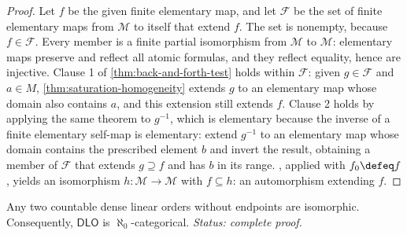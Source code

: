 \begin{proof}
Let \(f\) be the given finite elementary map, and let \(\mathcal F\) be
the set of finite elementary maps from \(\mathcal M\) to itself that
extend \(f\).  The set is nonempty, because \(f\in\mathcal F\).  Every
member is a finite partial isomorphism from \(\mathcal M\) to
\(\mathcal M\): elementary maps preserve and reflect all atomic formulas,
and they reflect equality, hence are injective.  Clause 1 of
\cref{thm:back-and-forth-test} holds within \(\mathcal F\): given
\(g\in\mathcal F\) and \(a\in M\), \cref{thm:saturation-homogeneity}
extends \(g\) to an elementary map whose domain also contains \(a\), and
this extension still extends \(f\).  Clause 2 holds by applying the same
theorem to \(g^{-1}\), which is elementary because the inverse of a
finite elementary self-map is elementary: extend \(g^{-1}\) to an
elementary map whose domain contains the prescribed element \(b\) and
invert the result, obtaining a member of \(\mathcal F\) that extends
\(g\supseteq f\) and has \(b\) in its range.
, applied with \(f_0\defeq f\), yields an
isomorphism \(h:\mathcal M\to\mathcal M\) with \(f\subseteq h\): an
automorphism extending \(f\).
\end{proof}

\begin{theorem}
\label{thm:dlo-countable-categorical}
Any two countable dense linear orders without endpoints are isomorphic.
Consequently, \(\mathsf{DLO}\) is \(\aleph_0\)-categorical.
\textit{Status: complete proof.}
\end{theorem}

